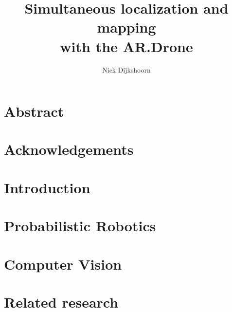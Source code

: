 \documentclass[twoside]{uva-bachelor-thesis}
\title{Simultaneous localization and mapping \\ \vspace{0.5cm} with the AR.Drone}
\author{Nick Dijkshoorn}
\begin{document}
\maketitle





\chapter*{Abstract}




\chapter*{Acknowledgements}




\tableofcontents
{}



\chapter{Introduction}
\label{chapter:introduction}




%


\chapter{Probabilistic Robotics}
\label{chapter:probabilistic-robotics}



\chapter{Computer Vision}
\label{chapter:computer-vision}



\chapter{Related research}
\label{chapter:related-research}

\end{document}
